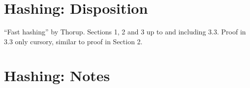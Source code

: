 \section{Hashing: Disposition}

``Fast hashing'' by Thorup. Sections 1, 2 and 3 up to and including 3.3. Proof
in 3.3 only cursory, similar to proof in Section 2.

\section{Hashing: Notes}